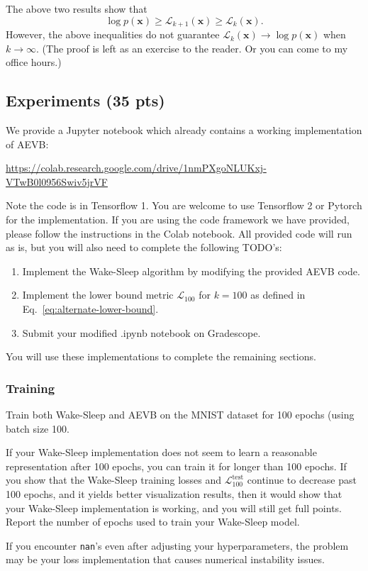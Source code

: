 The above two results show that
\[
\log p(\mathbf{x})
\geq \mathcal{L}_{k+1}(\mathbf{x})
\geq \mathcal{L}_{k}(\mathbf{x}).
\]
However, the above inequalities do not guarantee $\mathcal{L}_k(\mathbf{x}) \rightarrow \log p(\mathbf{x})$ when $k \rightarrow \infty$. (The proof is left as an exercise to the reader. Or you can come to my office hours.)

\subsection{Experiments (35 pts)}\label{section:1-implementation}

We provide a Jupyter notebook which already contains a working implementation of AEVB:
\begin{center}
\url{https://colab.research.google.com/drive/1nmPXgoNLUKxj-VTwB0l0956Swiv5jrVF}
\end{center}

Note the code is in Tensorflow 1. You are welcome to use Tensorflow 2 or Pytorch for the implementation. If you are using the code framework we have provided, please follow the instructions in the Colab notebook. All provided code will run as is, but you will also need to complete the following TODO's:
\begin{enumerate}
    \item Implement the Wake-Sleep algorithm by modifying the provided AEVB code.
    \item Implement the lower bound metric $\mathcal{L}_{100}$ for $k=100$ as defined in Eq.~\eqref{eq:alternate-lower-bound}.
    \item Submit your modified .ipynb notebook on Gradescope.
\end{enumerate}
You will use these implementations to complete the remaining sections. 

\subsubsection{Training}

Train both Wake-Sleep and AEVB on the MNIST dataset for 100 epochs (using batch size 100.

{If your Wake-Sleep implementation does not seem to learn a reasonable representation after 100 epochs, you can train it for longer than 100 epochs. If you show that the Wake-Sleep training losses and $\mathcal{L}_{100}^{\text{test}}$ continue to decrease past 100 epochs, and it yields better visualization results, then it would show that your Wake-Sleep implementation is working, and you will still get full points. Report the number of epochs used to train your Wake-Sleep model.

If you encounter \texttt{nan}'s even after adjusting your hyperparameters, the problem may be your loss implementation that causes numerical instability issues.}

